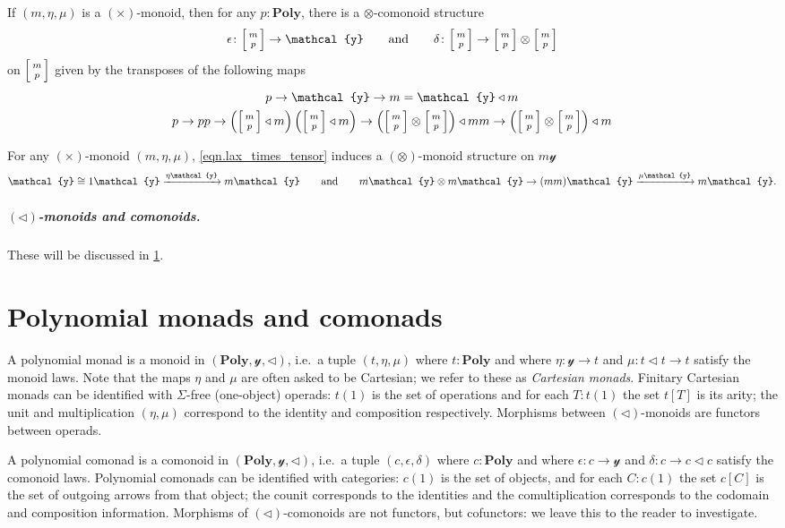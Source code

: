 \documentclass[11pt, one side, article]{memoir}
\makeatletter
\theoremstyle{definition}
\theoremstyle{plain}
\newcommand{\Cat}[1]{\mathbf{#1}}%
\newcommand{\To}[2][]{\xrightarrow[#1]{\tn{$#2$}}}
\newcommand{\tn}[1]{\textnormal{#1}}
\newcommand{\yon}{{\mathcal{y}}}
\newcommand{\poly}{\Cat{Poly}}
\newcommand{\0}{\textsf{0}}
\newcommand{\1}{\tn{\textsf{1}}}
\newcommand{\tri}{\mathbin{\triangleleft}}
\newcommand{\biglens}[2]{
     \begin{bmatrix}{\vphantom{f_f^f}#2} \\ {\vphantom{f_f^f}#1} \end{bmatrix}
}
\newcommand{\littlelens}[2]{
     \begin{bsmallmatrix}{\vphantom{f}#2} \\ {\vphantom{f}#1} \end{bsmallmatrix}
}
\newcommand{\lens}[2]{
  \relax\if@display
     \biglens{#1}{#2}
  \else
     \littlelens{#1}{#2}
  \fi
}
\newcommand{\hh}[2][]{#1 \tn{#2} #1}
\newcommand{\qqand}{\hh[\qquad]{and}}
\makeatother
\begin{document}
If $(m,\eta,\mu)$ is a $(\times)$-monoid, then for any $p:\poly$, there is a $\otimes$-comonoid structure
\begin{equation}
	\epsilon\colon\lens{p}{m}\to\yon
	\qqand
	\delta\colon\lens{p}{m}\to\lens{p}{m}\otimes\lens{p}{m}
\end{equation}
on $\lens{p}{m}$ given by the transposes of the following maps
\begin{gather}
	p\to \yon\to m=\yon\tri m\\
	p\to pp\to\left(\lens{p}{m}\tri m\right)\left(\lens{p}{m}\tri m\right)\to\left(\lens{p}{m}\otimes\lens{p}{m}\right)\tri mm\to\left(\lens{p}{m}\otimes\lens{p}{m}\right)\tri m
\end{gather}

For any $(\times)$-monoid $(m,\eta,\mu)$, \eqref{eqn.lax_times_tensor} induces a $(\otimes)$-monoid structure on $m\yon$
\begin{equation}
	\yon\cong1\yon\To{\eta\yon} m\yon
	\qqand
	m\yon\otimes m\yon\to (mm)\yon\To{\mu\yon} m\yon.
\end{equation}



\paragraph{$(\tri)$-monoids and comonoids.} These will be discussed in \cref{chap.monad_comonad}.


\chapter{Polynomial monads and comonads}\label{chap.monad_comonad}

A polynomial monad is a monoid in $(\poly,\yon,\tri)$, i.e.\ a tuple $(t,\eta,\mu)$ where $t:\poly$ and where $\eta\colon\yon\to t$ and $\mu\colon t\tri t\to t$ satisfy the monoid laws. Note that the maps $\eta$ and $\mu$ are often asked to be Cartesian; we refer to these as \emph{Cartesian monads}. Finitary Cartesian monads can be identified with $\Sigma$-free (one-object) operads: $t(1)$ is the set of operations and for each $T:t(1)$ the set $t[T]$ is its arity; the unit and multiplication $(\eta,\mu)$ correspond to the identity and composition respectively. Morphisms between $(\tri)$-monoids are functors between operads.


A polynomial comonad is a comonoid in $(\poly,\yon,\tri)$, i.e.\ a tuple $(c,\epsilon,\delta)$ where $c:\poly$ and where $\epsilon\colon c\to\yon$ and $\delta\colon c\to c\tri c$ satisfy the comonoid laws. Polynomial comonads can be identified with categories: $c(1)$ is the set of objects, and for each $C:c(1)$ the set $c[C]$ is the set of outgoing arrows from that object; the counit corresponds to the identities and the comultiplication corresponds to the codomain and composition information. Morphisms of $(\tri)$-comonoids are not functors, but cofunctors: we leave this to the reader to investigate.
\end{document}
